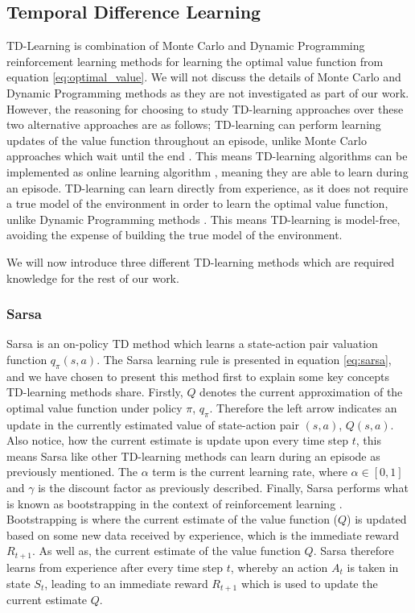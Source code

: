 \documentclass[../dissertation.tex]{subfiles}
\begin{document}
\subsection{Temporal Difference Learning}
\label{sec:td_learning}

TD-Learning is combination of Monte Carlo and Dynamic Programming reinforcement learning methods for learning the optimal value function from equation \ref{eq:optimal_value}. We will not discuss the details of Monte Carlo and Dynamic Programming methods as they are not investigated as part of our work. However, the reasoning for choosing to study  TD-learning approaches over these two alternative approaches are as follows; TD-learning can perform learning updates of the value function throughout an episode, unlike Monte Carlo approaches which wait until the end \cite{model_free_prediction}. This means TD-learning algorithms can be implemented as online learning algorithm \cite{sutton2011reinforcement}, meaning they are able to learn during an episode. TD-learning can learn directly from experience, as it does not require a true model of the environment in order to learn the optimal value function, unlike Dynamic Programming methods \cite{mdp_dynamic_prog}. This means TD-learning is model-free, avoiding the expense of building the true model of the environment.

We will now introduce three different TD-learning methods which are required knowledge for the rest of our work.

\subsubsection*{Sarsa}

Sarsa is an on-policy TD method which learns a state-action pair valuation function $q_\pi(s,a)$. The Sarsa learning rule is presented in equation \ref{eq:sarsa}, and we have chosen to present this method first to explain some key concepts TD-learning methods share. Firstly, $Q$ denotes the current approximation of the optimal value function under policy $\pi$, $q_\pi$. Therefore the left arrow indicates an update in the currently estimated value of state-action pair $(s,a)$, $Q(s,a)$. Also notice, how the current estimate is update upon every time step $t$, this means Sarsa like other TD-learning methods can learn during an episode as previously mentioned. The $\alpha$ term is the current learning rate, where $\alpha \in [0,1]$ and $\gamma$ is the discount factor as previously described. Finally, Sarsa performs what is known as bootstrapping in the context of reinforcement learning \cite{sutton2011reinforcement}. Bootstrapping is where the current estimate of the value function ($Q$) is updated based on some new data received by experience, which is the immediate reward $R_{t+1}$. As well as, the current estimate of the value function $Q$. Sarsa therefore learns from experience after every time step $t$, whereby an action $A_t$ is taken in state $S_{t}$, leading to an immediate reward $R_{t+1}$ which is used to update the current estimate $Q$.
\end{document}

